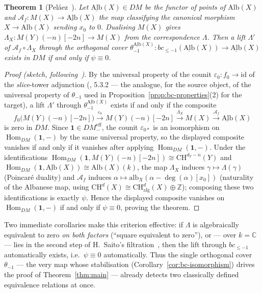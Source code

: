 \documentclass[12pt,a4paper]{article}
\newtheorem{theorem}{Theorem}[section]
\theoremstyle{definition}
\newcommand{\DMeff}{DM^{\mathrm{eff}}_{-}}
\newcommand{\Hom}{\operatorname{Hom}}
\newcommand{\CH}{\mathrm{CH}}
\newcommand{\Z}{\mathbb{Z}}
\newcommand{\Alb}{\mathrm{Alb}}
\newcommand{\alg}{\mathrm{alg}}
\begin{document}
\begin{theorem}[Peláez~\cite{Pel25}]\label{thm:app-chowcor}
Let $\underline{\Alb}(X)\in DM$ be the functor of points of $\Alb(X)$ and
$\mathcal A_f:M(X)\to\underline{\Alb}(X)$ the map classifying the canonical
morphism $X\to\Alb(X)$ sending $x_0$ to $0$.  Dualising $M(X)$ gives
$\Lambda_X:M(Y)(-n)[-2n]\to M(X)$ from the correspondence $\Lambda$.  Then a
lift $\Lambda'$ of $\mathcal A_f\circ\Lambda_X$ through the orthogonal cover
$\theta_{-1}^{\underline{\Alb}(X)}:bc_{\leq -1}(\underline{\Alb}(X))\to
\underline{\Alb}(X)$ exists in $DM$ \emph{if and only if} $\psi\equiv 0$.
\end{theorem}
\begin{proof}[Proof (sketch, following~\cite{Pel25})]
By the universal property of the counit $\varepsilon_0:f_0\to\mathrm{id}$ of
the \emph{slice}-tower adjunction (\cite{Pel17}, 5.3.2 — the analogue, for
the source object, of the universal property of $\theta_{-1}$ used in
Proposition~\ref{prop:bc-properties}(2) for the target), a lift $\Lambda'$
through $\theta_{-1}^{\underline{\Alb}(X)}$ exists if and only if the
composite
\[
  f_0\bigl(M(Y)(-n)[-2n]\bigr)
  \xrightarrow{\varepsilon_0}
  M(Y)(-n)[-2n]
  \xrightarrow{\Lambda_X}
  M(X)
  \xrightarrow{\mathcal A_f}
  \underline{\Alb}(X)
\]
is zero in $DM$.  Since $\mathbf 1\in\DMeff$, the counit
$\varepsilon_{0\ast}$ is an isomorphism on $\Hom_{DM}(\mathbf 1,-)$ by the
same universal property, so the displayed composite vanishes if and only if
it vanishes after applying $\Hom_{DM}(\mathbf 1,-)$.  Under the
identifications $\Hom_{DM}(\mathbf 1,M(Y)(-n)[-2n])\cong\CH^{d_Y-n}(Y)$ and
$\Hom_{DM}(\mathbf 1,\underline{\Alb}(X))\cong\Alb(X)(k)$, the map
$\Lambda_X$ induces $\gamma\mapsto\Lambda(\gamma)$ (Poincaré duality) and
$\mathcal A_f$ induces $\alpha\mapsto\mathrm{alb}_X(\alpha-\deg(\alpha)[x_0])$
(naturality of the Albanese map, using
$\CH^d(X)\cong\CH^d_{\alg}(X)\oplus\Z$); composing these two identifications
is exactly $\psi$.  Hence the displayed composite vanishes on
$\Hom_{DM}(\mathbf 1,-)$ if and only if $\psi\equiv 0$, proving the theorem.
\end{proof}

Two immediate corollaries make this criterion
effective: if $\Lambda$ is algebraically equivalent to zero \emph{on both
factors} (``square equivalent to zero''), or — over $k=\mathbb{C}$ — lies in the
second step of H.\ Saito's filtration~\cite{Sai79}, then the lift through
$bc_{\leq-1}$ automatically exists, i.e.\ $\psi\equiv 0$ automatically.  Thus
the single orthogonal cover $\theta_{-1}$ — the very map whose stabilisation
(Corollary~\ref{cor:bc-isomorphism}) drives the proof of
Theorem~\ref{thm:main} — already detects two classically defined equivalence
relations at once.
\end{document}
